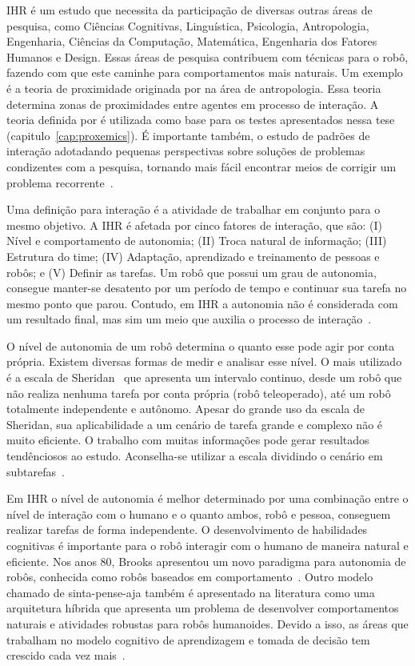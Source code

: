 IHR é um estudo que necessita da participação de diversas outras áreas de pesquisa, como Ciências Cognitivas, Linguística, Psicologia, Antropologia, Engenharia, Ciências da Computação, Matemática, Engenharia dos Fatores Humanos e Design. Essas áreas de pesquisa contribuem com técnicas para o robô, fazendo com que este caminhe para comportamentos mais naturais. Um exemplo é a teoria de proximidade originada por \textcite{hall:1969} na área de antropologia. Essa teoria determina zonas de proximidades entre agentes em processo de interação. A teoria definida por \textcite{hall:1969} é utilizada como base para os testes apresentados nessa tese (capitulo~\ref{cap:proxemics}). É importante também, o estudo de padrões de interação adotadando pequenas perspectivas sobre soluções de problemas condizentes com a pesquisa, tornando mais fácil encontrar meios de corrigir um problema recorrente~\cite{goodrich:2007}.

Uma definição para interação é a atividade de trabalhar em conjunto para o mesmo objetivo. A IHR é afetada por cinco fatores de interação, que são: (I) Nível e comportamento de autonomia; (II) Troca natural de informação; (III) Estrutura do time; (IV) Adaptação, aprendizado e treinamento de pessoas e robôs; e (V) Definir as tarefas. Um robô que possui um grau de autonomia, consegue manter-se desatento por um período de tempo e continuar sua tarefa no mesmo ponto que parou. Contudo, em IHR a autonomia não é considerada com um resultado final, mas sim um meio que auxilia o processo de interação~\cite{goodrich:2007, weiss:2010}.

O nível de autonomia de um robô determina o quanto esse pode agir por conta própria. Existem diversas formas de medir e analisar esse nível. O mais utilizado é a escala de Sheridan~\cite{sheridan:1978} que apresenta um intervalo continuo, desde um robô que não realiza nenhuma tarefa por conta própria (robô teleoperado), até um robô totalmente independente e autônomo. Apesar do grande uso da escala de Sheridan, sua aplicabilidade a um cenário de tarefa grande e complexo não é muito eficiente. O trabalho com muitas informações pode gerar resultados tendênciosos ao estudo. Aconselha-se utilizar a escala dividindo o cenário em subtarefas~\cite{goodrich:2007, weiss:2010}.

Em IHR o nível de autonomia é melhor determinado por uma combinação entre o nível de interação com o humano e o quanto ambos, robô e pessoa, conseguem realizar tarefas de forma independente. O desenvolvimento de habilidades cognitivas é importante para o robô interagir com o humano de maneira natural e eficiente. Nos anos 80, Brooks apresentou um novo paradigma para autonomia de robôs, conhecida como robôs baseados em comportamento~\cite{brooks:1986, brooks:1991}. Outro modelo chamado de sinta-pense-aja também é apresentado na literatura como uma arquitetura híbrida que apresenta um problema de desenvolver comportamentos naturais e atividades robustas para robôs humanoides. Devido a isso, as áreas que trabalham no modelo cognitivo de aprendizagem e tomada de decisão tem crescido cada vez mais~\cite{goodrich:2007}.

